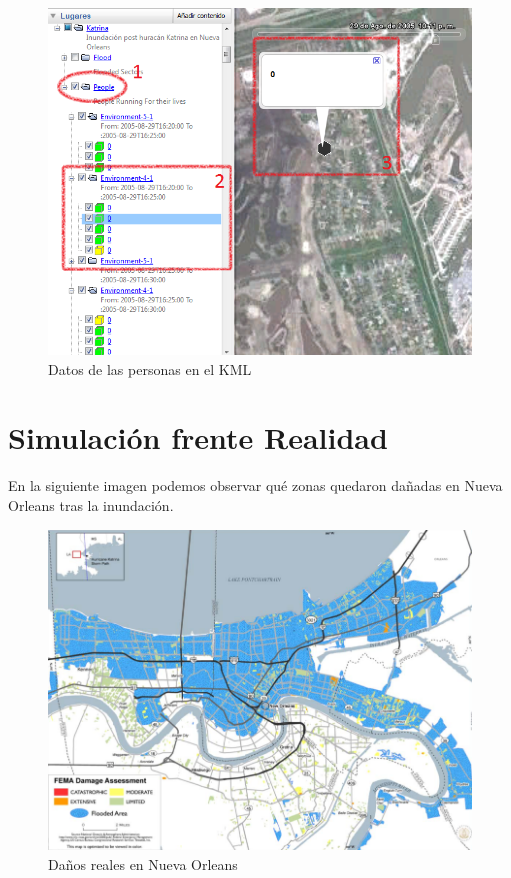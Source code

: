 \begin{figure}[H]
 \centering
 \includegraphics[width=130mm]{figuras/cap6/resultados/people_data.png}
 \caption{Datos de las personas en el KML}
\end{figure}


\section{Simulación frente Realidad}


En la siguiente imagen podemos observar qué zonas quedaron dañadas en Nueva
Orleans tras la inundación\cite{Gabe05}.

\begin{figure}[H]
 \centering
 \includegraphics[width=135mm]{figuras/cap6/NOdamage.png}
 \caption{Daños reales en Nueva Orleans}
\end{figure}

